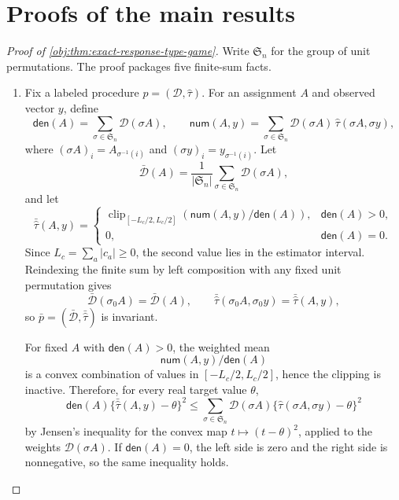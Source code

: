 \documentclass[11pt]{article}
\begin{document}
\section{Proofs of the main results}\label{sec:deferred-proofs}

\begin{proof}[Proof of \cref{obj:thm:exact-response-type-game}]
Write \(\mathfrak S_n\) for the group of unit permutations.  The proof packages five finite-sum facts.

\begin{enumerate}
\item Fix a labeled procedure \(p=(\mathcal D,\widehat\tau)\).  For an assignment \(A\) and observed vector \(y\), define
\[
\mathsf{den}(A)=\sum_{\sigma\in\mathfrak S_n}\mathcal D(\sigma A),
\qquad
\mathsf{num}(A,y)=
\sum_{\sigma\in\mathfrak S_n}\mathcal D(\sigma A)\,
\widehat\tau(\sigma A,\sigma y),
\]
where \((\sigma A)_i=A_{\sigma^{-1}(i)}\) and \((\sigma y)_i=y_{\sigma^{-1}(i)}\).  Let
\[
\bar{\mathcal D}(A)=\frac{1}{|\mathfrak S_n|}
\sum_{\sigma\in\mathfrak S_n}\mathcal D(\sigma A),
\]
and let
\[
\bar{\widehat\tau}(A,y)=
\begin{cases}
\operatorname{clip}_{[-L_c/2,L_c/2]}
\!\left(\mathsf{num}(A,y)/\mathsf{den}(A)\right),
& \mathsf{den}(A)>0,\\[2mm]
0,& \mathsf{den}(A)=0.
\end{cases}
\]
Since \(L_c=\sum_a |c_a|\ge 0\), the second value lies in the estimator interval.  Reindexing the finite sum by left composition with any fixed unit permutation gives
\[
\bar{\mathcal D}(\sigma_0 A)=\bar{\mathcal D}(A),
\qquad
\bar{\widehat\tau}(\sigma_0 A,\sigma_0 y)=\bar{\widehat\tau}(A,y),
\]
so \(\bar p=(\bar{\mathcal D},\bar{\widehat\tau})\) is invariant.

For fixed \(A\) with \(\mathsf{den}(A)>0\), the weighted mean
\[
\mathsf{num}(A,y)/\mathsf{den}(A)
\]
is a convex combination of values in \([-L_c/2,L_c/2]\), hence the clipping is inactive.  Therefore, for every real target value \(\theta\),
\[
\mathsf{den}(A)\{\bar{\widehat\tau}(A,y)-\theta\}^2
\le
\sum_{\sigma\in\mathfrak S_n}
\mathcal D(\sigma A)\{\widehat\tau(\sigma A,\sigma y)-\theta\}^2
\]
by Jensen's inequality for the convex map \(t\mapsto(t-\theta)^2\), applied to the weights \(\mathcal D(\sigma A)\).  If \(\mathsf{den}(A)=0\), the left side is zero and the right side is nonnegative, so the same inequality holds.


\end{enumerate}
\end{proof}
\end{document}

